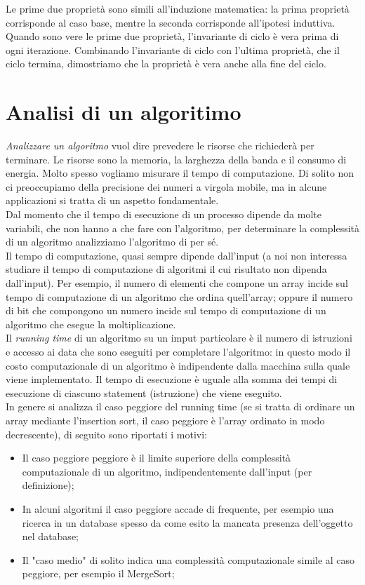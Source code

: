 \documentclass{article}
\begin{document}
Le prime due proprietà sono simili all'induzione matematica: la prima proprietà
corrisponde al caso base, mentre la seconda corrisponde all'ipotesi induttiva. Quando
sono vere le prime due proprietà, l'invariante di ciclo è vera prima di ogni
iterazione. Combinando l'invariante di ciclo con l'ultima proprietà, che il
ciclo termina, dimostriamo che la proprietà è vera anche alla fine del ciclo.

\section{Analisi di un algoritimo}
\textit{Analizzare un algoritmo} vuol dire prevedere le risorse che richiederà
per terminare. Le risorse sono la memoria, la larghezza della banda e il
consumo di energia. Molto spesso vogliamo misurare il tempo di computazione.
Di solito non ci preoccupiamo della precisione dei numeri a virgola mobile,
ma in alcune applicazioni si tratta di un aspetto fondamentale.\\

Dal momento che il tempo di esecuzione di un processo dipende da molte variabili,
che non hanno a che fare con l'algoritmo, per determinare la complessità
di un algoritmo analizziamo l'algoritmo di per sé.\\
Il tempo di computazione, quasi sempre dipende dall'input (a noi non interessa
studiare il tempo di computazione di algoritmi il cui risultato non dipenda
dall'input). Per esempio, il numero di elementi che compone un array incide sul tempo di computazione di un
algoritmo che ordina quell'array; oppure il numero di bit che compongono un
numero incide sul tempo di computazione di un algoritmo che esegue la
moltiplicazione.\\
Il \textit{running time} di un algoritmo su un imput particolare è il numero di
istruzioni e accesso ai data che sono eseguiti per completare l'algoritmo: in
questo modo il costo computazionale di un algoritmo è indipendente dalla
macchina sulla quale viene implementato.
Il tempo di esecuzione è uguale alla somma dei tempi di esecuzione di ciascuno
statement (istruzione) che viene eseguito.\\
In genere si analizza il caso peggiore del running time (se si tratta di
ordinare un array mediante l'insertion sort, il caso peggiore è l'array ordinato
in modo decrescente), di seguito sono riportati i motivi:
\begin{itemize}
	\item Il caso peggiore peggiore è il limite superiore della complessità
	      computazionale di un algoritmo, indipendentemente dall'input (per
	      definizione);
	\item In alcuni algoritmi il caso peggiore accade di frequente, per esempio
	      una ricerca in un database spesso da come esito la mancata
	      presenza dell'oggetto nel database;
	\item Il "caso medio" di solito indica una complessità computazionale simile
	      al caso peggiore, per esempio il MergeSort;
\end{itemize}
\end{document}
